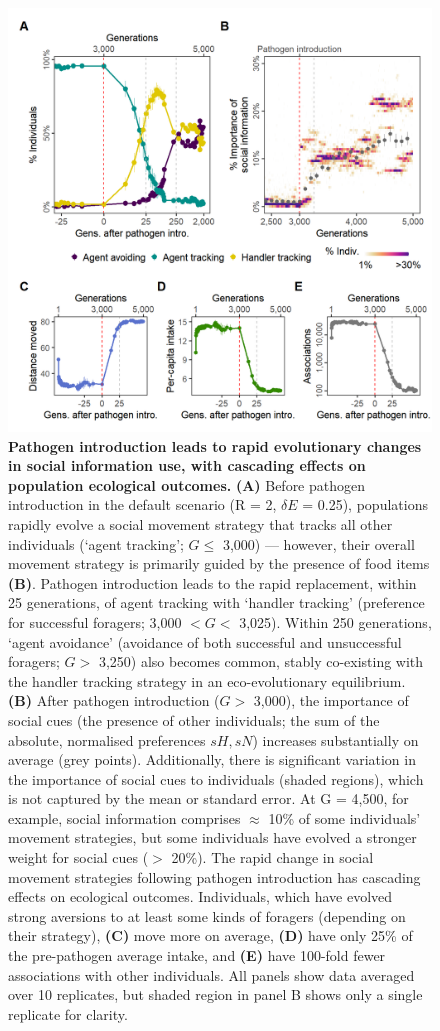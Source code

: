 \begin{figure}[!h]
    \centering
    \includegraphics[width=0.7\linewidth]{figures/pathomove/fig_eco_evo_general.png}
    \caption{
        \textbf{Pathogen introduction leads to rapid evolutionary changes in social information use, with cascading effects on population ecological outcomes.}
        \textbf{(A)} Before pathogen introduction in the default scenario (R = 2, $\delta E$ = 0.25), populations rapidly evolve a social movement strategy that tracks all other individuals (`agent tracking'; $G \leq$ 3,000) --- however, their overall movement strategy is primarily guided by the presence of food items \textbf{(B)}.
        Pathogen introduction leads to the rapid replacement, within 25 generations, of agent tracking with `handler tracking' (preference for successful foragers; 3,000 $< G <$ 3,025). 
        Within 250 generations, `agent avoidance' (avoidance of both successful and unsuccessful foragers; $G >$ 3,250) also becomes common, stably co-existing with the handler tracking strategy in an eco-evolutionary equilibrium.
        \textbf{(B)} After pathogen introduction ($G >$ 3,000), the importance of social cues (the presence of other individuals; the sum of the absolute, normalised preferences $sH, sN$) increases substantially on average (grey points).
        Additionally, there is significant variation in the importance of social cues to individuals (shaded regions), which is not captured by the mean or standard error.
        At G = 4,500, for example, social information comprises $\approx$ 10\% of some individuals' movement strategies, but some individuals have evolved a stronger weight for social cues ($>$ 20\%).
        The rapid change in social movement strategies following pathogen introduction has cascading effects on ecological outcomes.
        Individuals, which have evolved strong aversions to at least some kinds of foragers (depending on their strategy), \textbf{(C)} move more on average, \textbf{(D)} have only 25\% of the pre-pathogen average intake, and \textbf{(E)} have 100-fold fewer associations with other individuals.
        All panels show data averaged over 10 replicates, but shaded region in panel B shows only a single replicate for clarity.
    }
    \label{fig_eco_evo_general}
\end{figure}

